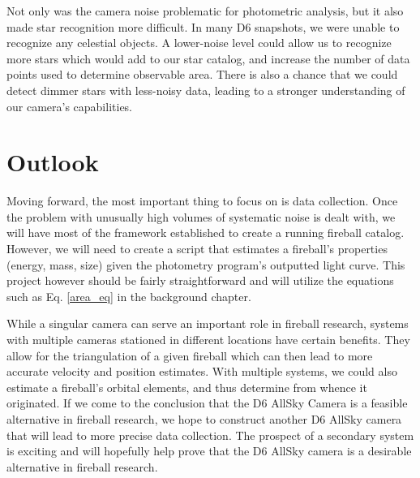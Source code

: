 Not only was the camera noise problematic for photometric analysis, but it also made star recognition more difficult.
In many D6 snapshots, we were unable to recognize any celestial objects.
A lower-noise level could allow us to recognize more stars which would add to our star catalog, and increase the number of data points used to determine observable area.
There is also a chance that we could detect dimmer stars with less-noisy data, leading to a stronger understanding of our camera's capabilities.

\section{Outlook}

Moving forward, the most important thing to focus on is data collection.
Once the problem with unusually high volumes of systematic noise is dealt with, we will have most of the framework established to create a running fireball catalog.
However, we will need to create a script that estimates a fireball's properties (energy, mass, size) given the photometry program's outputted light curve.
This project however should be fairly straightforward and will utilize the equations such as Eq. \ref{area_eq} in the background chapter.

While a singular camera can serve an important role in fireball research, systems with multiple cameras stationed in different locations have certain benefits.
They allow for the triangulation of a given fireball which can then lead to more accurate velocity and position estimates.
With multiple systems, we could also estimate a fireball's orbital elements, and thus determine from whence it originated.
If we come to the conclusion that the D6 AllSky Camera is a feasible alternative in fireball research, we hope to construct another D6 AllSky camera that will lead to more precise data collection. 
The prospect of a secondary system is exciting and will hopefully help prove that the D6 AllSky camera is a desirable alternative in fireball research.